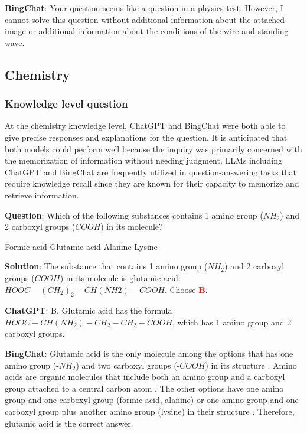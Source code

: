 \documentclass{article}
\begin{document}
{\begin{mdframed}[linewidth=1pt,linecolor=red]
		\textbf{BingChat}: Your question seems like a question in a physics test. However, I cannot solve this question without additional information about the attached image or additional information about the conditions of the wire and standing wave.
		
		
	\end{mdframed}	

	\subsection{Chemistry}
	\label{VNHSGE_Che}
	
	\subsubsection{Knowledge level question}
	\label{VNHSGE_Che_K}
	
	At the chemistry knowledge level, ChatGPT and BingChat were both able to give precise responses and explanations for the question. It is anticipated that both models could perform well because the inquiry was primarily concerned with the memorization of information without needing judgment. LLMs including ChatGPT and BingChat are frequently utilized in question-answering tasks that require knowledge recall since they are known for their capacity to memorize and retrieve information.
	
	
	\begin{mdframed}[linewidth=1pt,linecolor=red] \textbf{Question}: Which of the following substances contains 1 amino group ($NH_2$) and 2 carboxyl groups ($COOH$) in its molecule? 
		
		\begin{oneparchoices}
			\choice Formic acid
			\choice Glutamic acid
			\choice Alanine
			\choice Lysine 
		\end{oneparchoices}
		
		\textbf{Solution}: The substance that contains 1 amino group ($NH_2$) and 2 carboxyl groups ($COOH$) in its molecule is glutamic acid: $HOOC-(CH_2)_2-CH(NH2)-COOH$. Choose \textcolor{red}{\textbf{B}}.
		
		\textbf{ChatGPT}: B. Glutamic acid has the formula $HOOC-CH(NH_2)-CH_2-CH_2-COOH$, which has 1 amino group and 2 carboxyl groups.


		\textbf{BingChat}: 
		Glutamic acid is the only molecule among the options that has one amino group (-$NH_2$) and two carboxyl groups (-$COOH$) in its structure . Amino acids are organic molecules that include both an amino group and a carboxyl group attached to a central carbon atom . The other options have one amino group and one carboxyl group (formic acid, alanine) or one amino group and one carboxyl group plus another amino group (lysine) in their structure . Therefore, glutamic acid is the correct answer.
		

\end{mdframed}}
\end{document}
